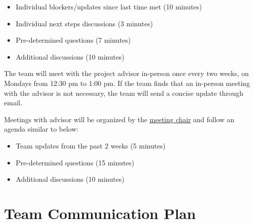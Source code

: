 \documentclass{article}
\begin{document}
\begin{itemize}
  \item Individual blockers/updates since last time met (10 minutes)
  \item Individual next steps discussions (3 minutes)
  \item Pre-determined questions (7 minutes)
  \item Additional discussions (10 minutes)
\end{itemize}

The team will meet with the project advisor in-person once every two weeks, on Mondays from 12:30 pm to 1:00 pm.
If the team finds that an in-person meeting with the advisor is not necessary, the team will send a concise update through email.

Meetings with advisor will be organized by the \hyperref[role:meeting_chair]{meeting chair} and follow an agenda similar to below:

\begin{itemize}
  \item Team updates from the past 2 weeks (5 minutes)
  \item Pre-determined questions (15 minutes)
  \item Additional discussions (10 minutes)
\end{itemize}

\section{Team Communication Plan}
\end{document}
